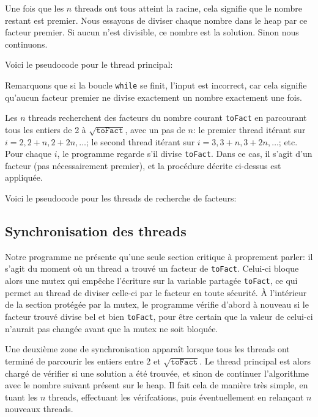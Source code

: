 \documentclass[a4paper,10pt]{article}
\begin{document}
Une fois que les $n$ threads ont tous atteint la racine, cela signifie que le nombre restant est premier. Nous essayons de diviser chaque nombre dans le heap par ce facteur premier. Si aucun n'est divisible, ce nombre est la solution. Sinon nous continuons.

Voici le pseudocode pour le thread principal:



Remarquons que si la boucle \texttt{while} se finit, l'input est incorrect, car cela signifie qu'aucun facteur premier ne divise exactement un nombre exactement une fois.

Les $n$ threads recherchent des facteurs du nombre courant \texttt{toFact} en parcourant tous les entiers de 2 à $\sqrt{\texttt{toFact}}$, avec un pas de $n$: le premier thread itérant sur $i=2,2+n,2+2n,\dots$; le second thread itérant sur $i=3,3+n,3+2n,\dots$; etc. Pour chaque $i$, le programme regarde s'il divise \texttt{toFact}. Dans ce cas, il s'agit d'un facteur (pas nécessairement premier), et la procédure décrite ci-dessus est appliquée.

Voici le pseudocode pour les threads de recherche de facteurs:



\subsection*{Synchronisation des threads}

Notre programme ne présente qu'une seule section critique à proprement parler: il s'agit du moment où un thread a trouvé un facteur de \texttt{toFact}. Celui-ci bloque alors une mutex qui empêche l'écriture sur la variable partagée \texttt{toFact}, ce qui permet au thread de diviser celle-ci par le facteur en toute sécurité. À l'intérieur de la section protégée par la mutex, le programme vérifie d'abord à nouveau si le facteur trouvé divise bel et bien \texttt{toFact}, pour être certain que la valeur de celui-ci n'aurait pas changée avant que la mutex ne soit bloquée.

Une deuxième zone de synchronisation apparaît lorsque tous les threads ont terminé de parcourir les entiers entre 2 et $\sqrt{\texttt{toFact}}$. Le thread principal est alors chargé de vérifier si une solution a été trouvée, et sinon de continuer l'algorithme avec le nombre suivant présent sur le heap. Il fait cela de manière très simple, en tuant les $n$ threads, effectuant les vérifcations, puis éventuellement en relançant $n$ nouveaux threads.
\end{document}
